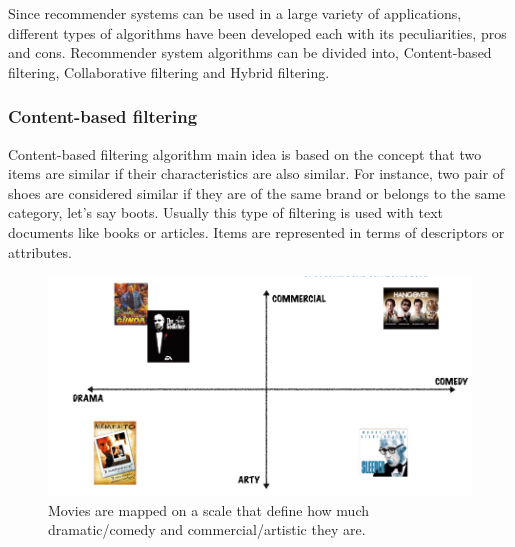\documentclass[b5paper,10pt,twoside,cucitura]{toptesi}
\begin{document}
Since recommender systems can be used in a large variety of applications, different types of algorithms have been developed each with its peculiarities, pros and cons. Recommender system algorithms can be divided into, Content-based filtering, Collaborative filtering and Hybrid filtering.

\subsubsection{Content-based filtering}

Content-based filtering algorithm main idea is based on the concept that two items are similar if their characteristics are also similar. For instance, two pair of shoes are considered similar if they are of the same brand or belongs to the same category, let's say boots. Usually this type of filtering is used with text documents like books or articles. Items are represented in terms of descriptors or attributes. 

\begin{figure}[h]
\centering
\includegraphics[scale=0.6]{content-based}
\caption{Movies are mapped on a scale that define how much dramatic/comedy and commercial/artistic they are.}
\end{figure}
\end{document}

